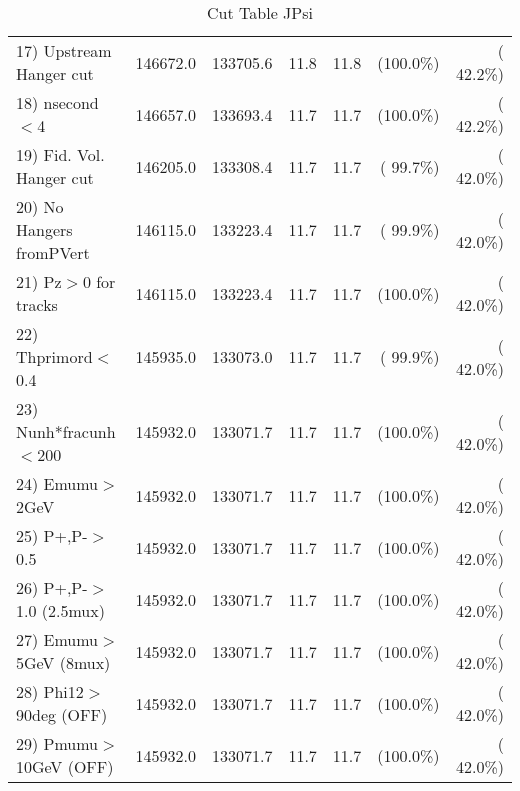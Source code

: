 \begin{table}[h!]
\begin{tabular}{||l||r|r|r|r|r|r||}
 17) Upstream Hanger cut  &     146672.0 &     133705.6 &         11.8 &         11.8 & (100.0\%) & ( 42.2\%) \\
 18) nsecond$<$4          &     146657.0 &     133693.4 &         11.7 &         11.7 & (100.0\%) & ( 42.2\%) \\
 19) Fid. Vol. Hanger cut &     146205.0 &     133308.4 &         11.7 &         11.7 & ( 99.7\%) & ( 42.0\%) \\
 20) No Hangers fromPVert &     146115.0 &     133223.4 &         11.7 &         11.7 & ( 99.9\%) & ( 42.0\%) \\
 21) Pz$>$0 for tracks    &     146115.0 &     133223.4 &         11.7 &         11.7 & (100.0\%) & ( 42.0\%) \\
 22) Thprimord$<$0.4      &     145935.0 &     133073.0 &         11.7 &         11.7 & ( 99.9\%) & ( 42.0\%) \\
 23) Nunh*fracunh$<$200   &     145932.0 &     133071.7 &         11.7 &         11.7 & (100.0\%) & ( 42.0\%) \\
 24) Emumu$>$2GeV         &     145932.0 &     133071.7 &         11.7 &         11.7 & (100.0\%) & ( 42.0\%) \\
 25) P+,P-$>$0.5          &     145932.0 &     133071.7 &         11.7 &         11.7 & (100.0\%) & ( 42.0\%) \\
 26) P+,P-$>$1.0 (2.5mux) &     145932.0 &     133071.7 &         11.7 &         11.7 & (100.0\%) & ( 42.0\%) \\
 27) Emumu$>$5GeV  (8mux) &     145932.0 &     133071.7 &         11.7 &         11.7 & (100.0\%) & ( 42.0\%) \\
 28) Phi12$>$90deg  (OFF) &     145932.0 &     133071.7 &         11.7 &         11.7 & (100.0\%) & ( 42.0\%) \\
 29) Pmumu$>$10GeV  (OFF) &     145932.0 &     133071.7 &         11.7 &         11.7 & (100.0\%) & ( 42.0\%) \\
 \hline
 \hline
 \end{tabular}
 \caption{Cut Table  JPsi     }
 \label{tab-cutcohjpsi-mumu_jpsi}
 \end{table}
